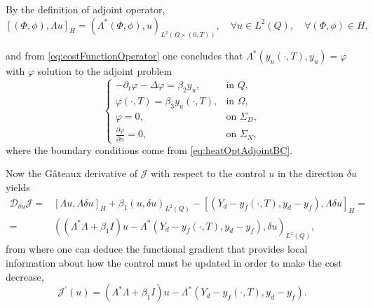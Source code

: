 \documentclass[12pt,a4paper]{article}
\theoremstyle{plain}
\theoremstyle{definition}
\begin{document}
By the definition of adjoint operator,
%
\begin{equation*} 
\left[ \left( \Phi, \phi \right), \Lambda u \right]_H = \left( \Lambda^* \left( \Phi, \phi \right), u \right)_{L^2\left(\Omega \times \left( 0, T \right) \right)}, \quad \forall u \in L^2\left( Q \right), \quad \forall \left( \Phi, \phi \right) \in H,
\end{equation*}

and from \eqref{eq:costFunctionOperator} one concludes that $\Lambda^* \left( y_u \left( \cdot, T \right), y_u \right) = \varphi$ with $\varphi$ solution to the adjoint problem
%
\begin{equation}
\begin{cases}
-\partial_t \varphi - \Delta \varphi = \beta_2 y_u, & \text{in } Q, \\
\varphi\left( \cdot, T \right) = \beta_3 y_u \left( \cdot, T \right), & \text{in } \Omega, \\
\varphi = 0, & \text{on } \Sigma_D, \\
\displaystyle \frac{\partial \varphi}{\partial n} = 0, & \text{on } \Sigma_N,
\end{cases}
\end{equation}
%
where the boundary conditions come from \eqref{eq:heatOptAdjointBC}.



Now the Gâteaux derivative of $\mathcal{J}$ with respect to the control $u$ in the direction $\delta u$ yields
%
\begin{equation*}
\begin{split}
\mathcal{D}_{\delta u}\mathcal{J} = & \left[ \Lambda u, \Lambda \delta u \right]_H + \beta_1 \left( u, \delta u \right)_{L^2\left(Q \right)} - \left[ \left( Y_d - y_f \left( \cdot, T \right), y_d - y_f \right), \Lambda \delta u \right]_H = \\
= & \left( \left( \Lambda^* \Lambda + \beta_1 I \right)u - \Lambda^*\left( Y_d - y_f \left( \cdot, T \right), y_d - y_f \right), \delta u \right)_{L^2\left(Q \right)},
\end{split}
\end{equation*}
%
from where one can deduce the functional gradient that provides local information about how the control must be updated in order to make the cost decrease,
%
\begin{equation} \label{eq:heatOptGradient}
\mathcal{J}^\prime \left( u \right) = \left( \Lambda^* \Lambda + \beta_1 I \right)u - \Lambda^*\left( Y_d - y_f \left( \cdot, T \right), y_d - y_f \right).
\end{equation}
\end{document}
